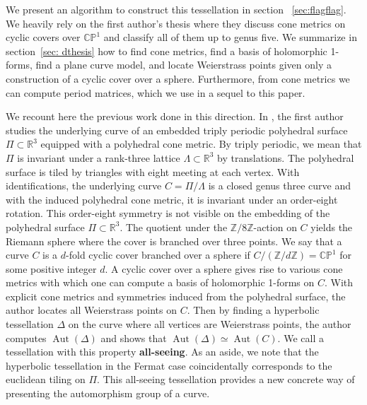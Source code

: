\documentclass[12pt,reqno]{amsart}
\DeclareMathOperator{\Aut}{Aut}
\newcommand{\Z}{\mathbb{Z}}
\newcommand{\R}{\mathbb{R}}
\theoremstyle{definition}
\theoremstyle{remark}
\begin{document}
We present an algorithm to construct this tessellation in section ~\ref{sec:flagflag}. We heavily rely on the first author's thesis \cite{dthesis} where they discuss cone metrics on cyclic covers over $\mathbb{C}\mathbb{P}^1$ and classify all of them up to genus five. We summarize in section~\ref{sec: dthesis} how to find cone metrics, find a basis of holomorphic 1-forms, find a plane curve model, and locate Weierstrass points given only a construction of a cyclic cover over a sphere. Furthermore, from cone metrics we can compute period matrices, which we use in a sequel to this paper. 

We recount here the previous work done in this direction. In \cite{dami}, the first author studies the underlying curve of an embedded triply periodic polyhedral surface $\Pi \subset \R^3$ equipped with a polyhedral cone metric. By triply periodic, we mean that $\Pi$ is invariant under a rank-three lattice $\Lambda \subset \R^3$ by translations. The polyhedral surface is tiled by triangles with eight meeting at each vertex. With identifications, the underlying curve $C = \Pi / \Lambda$ is a closed genus three curve and with the induced polyhedral cone metric, it is invariant under an order-eight rotation. This order-eight symmetry is not visible on the embedding of the polyhedral surface $\Pi \subset \R^3.$ The quotient under the $\Z/ 8 \Z$-action on $C$ yields the Riemann sphere where the cover is branched over three points. We say that a curve $C$ is a $d$-fold cyclic cover branched over a sphere if $C / (\Z / d \Z) = \mathbb{C}\mathbb{P}^1$ for some positive integer $d.$ A cyclic cover over a sphere gives rise to various cone metrics with which one can compute a basis of holomorphic 1-forms on $C.$ With explicit cone metrics and symmetries induced from the polyhedral surface, the author locates all Weierstrass points on $C.$ Then by finding a hyperbolic tessellation $\Delta$ on the curve where all vertices are Weierstrass points, the author computes $\Aut(\Delta)$ and shows that $\Aut(\Delta) \simeq \Aut(C)$. We call a tessellation with this property \textbf{all-seeing}. As an aside, we note that the hyperbolic tessellation  in the Fermat case coincidentally corresponds to the euclidean tiling on $\Pi.$ This all-seeing tessellation provides a new concrete way of presenting the automorphism group of a curve.
\end{document}
